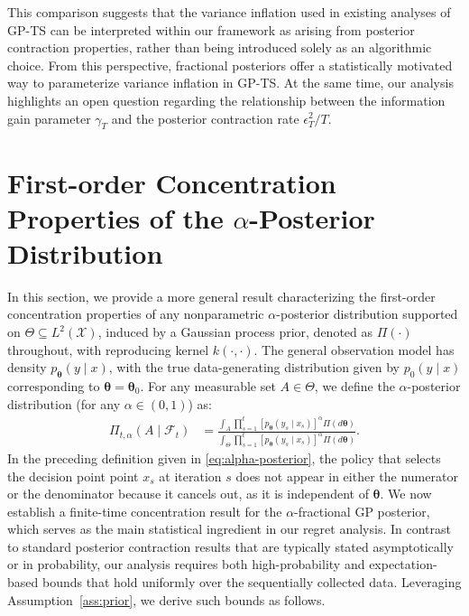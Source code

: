 \documentclass[final,12pt]{colt2026} %
\begin{document}
This comparison suggests that the variance inflation used in existing analyses of GP-TS can be interpreted within our framework as arising from posterior contraction properties, rather than being introduced solely as an algorithmic choice. From this perspective, fractional posteriors offer a statistically motivated way to parameterize variance inflation in GP-TS. At the same time, our analysis highlights an open question regarding the relationship between the information gain parameter $\gamma_T$ and the posterior contraction rate $\epsilon_T^2/T$.

\section{\texorpdfstring{First-order Concentration Properties of the $\alpha$-Posterior Distribution}{First-order Concentration Properties of the alpha-Posterior Distribution}}\label{subsec:first-order-concentration}
In this section, we provide a more general result characterizing the first-order concentration properties of any nonparametric $\alpha$-posterior distribution supported on $\Theta \subseteq L^2(\mathcal X)$, induced by a Gaussian process prior, denoted as $\Pi(\cdot)$ throughout, with reproducing kernel $k(\cdot, \cdot)$. The general observation model has density $p_{\pmb\theta}(y\mid x)$, with the true data-generating distribution given by $p_{0}(y \mid x)$ corresponding to $\pmb \theta=\pmb \theta_0$. For any measurable set $A\in \Theta$, we define the $\alpha$-posterior distribution (for any $\alpha\in(0,1)$) as: 
\begin{align}\label{eq:alpha-posterior}
    \Pi_{t,\alpha}(A \mid \mathcal{F}_t)&= \frac{ \int_{A}  \prod_{s=1}^{t} [p_{\pmb \theta}(y_s \mid x_s)]^{\alpha}\Pi(d\pmb \theta) } { \int_\Theta  \prod_{s=1}^{t} [p_{\pmb \theta}(y_s \mid x_s)]^{\alpha} \Pi(d\pmb \theta)  }.
\end{align}
In the preceding definition given in \eqref{eq:alpha-posterior}, the policy that selects the decision point point $x_s$ at iteration $s$ does not appear in either the numerator or the denominator because it cancels out, as it is independent of $\pmb{\theta}$. We now establish a finite-time concentration result for the $\alpha$-fractional GP posterior, which serves as the main statistical ingredient in our regret analysis. In contrast to standard posterior contraction results that are typically stated asymptotically or in probability, our analysis requires both high-probability and expectation-based bounds that hold uniformly over the sequentially collected data. Leveraging Assumption~\ref{ass:prior}, we derive such bounds as follows.
\end{document}
